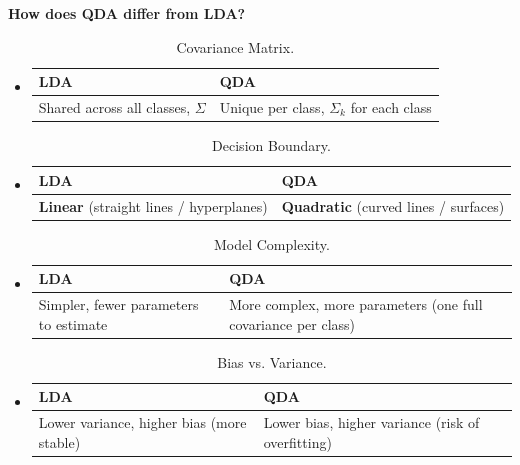 \begin{flushleft}
    \textcolor{Green3}{ \textbf{How does QDA differ from LDA?}}
\end{flushleft}
\begin{itemize}
    \item {}
    \begin{table}[!htp]
        \centering
        \begin{tabular}{@{} l | l @{}}
            \toprule
            LDA & QDA \\
            \midrule
            Shared across all classes, $\Sigma$ & Unique per class, $\Sigma_{k}$ for each class \\
            \bottomrule
        \end{tabular}
        \caption*{Covariance Matrix.}
    \end{table}

    \item {}
    \begin{table}[!htp]
        \centering
        \begin{tabular}{@{} l | l @{}}
            \toprule
            LDA & QDA \\
            \midrule
            \textbf{Linear} (straight lines / hyperplanes) & \textbf{Quadratic} (curved lines / surfaces) \\
            \bottomrule
        \end{tabular}
        \caption*{Decision Boundary.}
    \end{table}

    \item {}
    \begin{table}[!htp]
        \centering
        \begin{tabular}{@{} l | p{16em} @{}}
            \toprule
            LDA & QDA \\
            \midrule
            Simpler, fewer parameters to estimate & More complex, more parameters (one full covariance per class) \\
            \bottomrule
        \end{tabular}
        \caption*{Model Complexity.}
    \end{table}

    \item {}
    \begin{table}[!htp]
        \centering
        \begin{tabular}{@{} p{16.5em} | p{16.5em} @{}}
            \toprule
            LDA & QDA \\
            \midrule
            Lower variance, higher bias (more stable) & Lower bias, higher variance (risk of overfitting) \\
            \bottomrule
        \end{tabular}
        \caption*{Bias vs. Variance.}
    \end{table}


\end{itemize}
